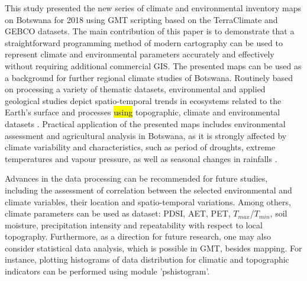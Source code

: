 \documentclass[ijgi,article,submit,pdftex,moreauthors]{Definitions/mdpi}
\begin{document}
This study presented the new series of climate and environmental inventory maps on Botswana for 2018 using GMT scripting based on the TerraClimate and GEBCO datasets. The main contribution of this paper is to demonstrate that a straightforward programming method of modern cartography can be used to represent climate and environmental parameters accurately and effectively without requiring additional commercial GIS. The presented maps can be used as a background for further regional climate studies of Botswana. Routinely based on processing a variety of thematic datasets, environmental and applied geological studies depict spatio-temporal trends in ecosystems related to the Earth’s surface and processes \hl{using} topographic, climate and environmental datasets  \cite{AkinyemiKgomo,Ishimoto,Klauco2013,Eze,Lemenkova202212,Chipanshi,Klauco2017}. Practical application of the presented maps includes environmental assessment and agricultural analysis in Botswana, as it is strongly affected by climate variability and characteristics, such as period of droughts, extreme temperatures and vapour pressure, as well as seasonal changes in rainfalls \cite{Maruatona,PARIDA2008614,MOSES2018102,DAHLBERG200019}.

Advances in the data processing can be recommended for future studies, including the assessment of correlation between the selected environmental and climate variables, their location and spatio-temporal variations. Among others, climate parameters can be used as dataset: PDSI, AET, PET, $T_{max}$/$T_{min}$, soil moisture, precipitation intensity and repeatability with respect to local topography. Furthermore, as a direction for future research, one may also consider statistical data analysis, which is possible in GMT, besides mapping. For instance, plotting histograms of data distribution for climatic and topographic indicators can be performed using module 'pshistogram'.

\vspace{6pt} 




\end{document}
